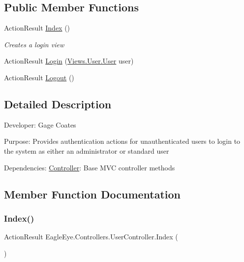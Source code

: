 \subsection*{Public Member Functions}
\begin{DoxyCompactItemize}
\item 
Action\+Result \mbox{\hyperlink{class_eagle_eye_1_1_controllers_1_1_user_controller_a9562eb9abf6432e9360af19bb046a775}{Index}} ()
\begin{DoxyCompactList}\small\item\em Creates a login view \end{DoxyCompactList}\item 
Action\+Result \mbox{\hyperlink{class_eagle_eye_1_1_controllers_1_1_user_controller_ad2199840c954a1a465e25087fee02564}{Login}} (\mbox{\hyperlink{class_eagle_eye_1_1_views_1_1_user_1_1_user}{Views.\+User.\+User}} user)
\item 
Action\+Result \mbox{\hyperlink{class_eagle_eye_1_1_controllers_1_1_user_controller_a23b7abc37b240a70620675d09edecf8c}{Logout}} ()
\end{DoxyCompactItemize}


\subsection{Detailed Description}
Developer\+: Gage Coates 

Purpose\+: Provides authentication actions for unauthenticated users to login to the system as either an administrator or standard user

Dependencies\+: \mbox{\hyperlink{class_controller}{Controller}}\+: Base M\+VC controller methods 

\subsection{Member Function Documentation}
\mbox{\label{class_eagle_eye_1_1_controllers_1_1_user_controller_a9562eb9abf6432e9360af19bb046a775}} 
\subsubsection{\texorpdfstring{Index()}{Index()}}
{\footnotesize\ttfamily Action\+Result Eagle\+Eye.\+Controllers.\+User\+Controller.\+Index (\begin{DoxyParamCaption}{ }\end{DoxyParamCaption})}



